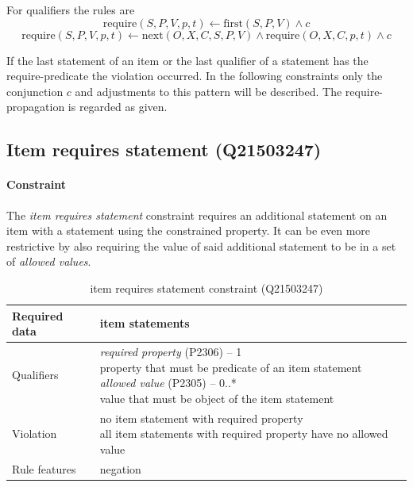 \documentclass[hyperref,bachelorofscience,fleqn]{cgvpub}
\begin{document}
For qualifiers the rules are
\begin{equation*}
\text{require}(S, P, V, p, t) \leftarrow \text{first}(S, P, V) \wedge c
\end{equation*}
\begin{equation*}
\text{require}(S, P, V, p, t) \leftarrow \text{next}(O, X, C, S, P, V) \wedge \text{require}(O, X, C, p, t) \wedge c
\end{equation*}

If the last statement of an item or the last qualifier of a statement has the require-predicate the violation occurred. In the following constraints only the conjunction \(c\) and adjustments to this pattern will be described. The require-propagation is regarded as given.

\subsection{Item requires statement (Q21503247)}\label{subsec_item_requires_statement}
\paragraph{Constraint}
The \emph{item requires statement} constraint requires an additional statement on an item with a statement using the constrained property. It can be even more restrictive by also requiring the value of said additional statement to be in a set of \emph{allowed values}.
\begin{table}[H]
\caption{item requires statement constraint (Q21503247)}\label{tab_item_requires_statements}
\begin{tabularx}{\textwidth}{ ll X}
\hline
Required data & item statements \\
\hline
Qualifiers & \makecell{\emph{required property} (P2306) -- 1 \\ property that must be predicate of an item statement \\
\emph{allowed value} (P2305) -- 0..* \\ value that must be object of the item statement} \\
\hline
Violation & \makecell{no item statement with required property \\ all item statements with required property have no allowed value} \\
\hline
Rule features & negation \\
\hline
\end{tabularx}
\end{table}
\end{document}
